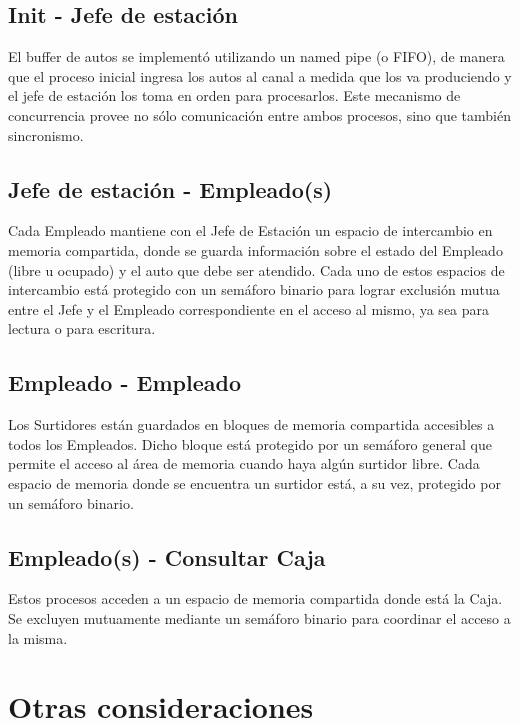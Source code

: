 \documentclass{article}
\begin{document}
\subsection{Init - Jefe de estación}
El buffer de autos se implementó utilizando un named pipe (o FIFO), de manera que el proceso inicial ingresa los autos al canal a medida que los va produciendo y el jefe de estación los toma en orden para procesarlos. Este mecanismo de concurrencia provee no sólo comunicación entre ambos procesos, sino que también sincronismo.
\subsection{Jefe de estación - Empleado(s)}
Cada Empleado mantiene con el Jefe de Estación un espacio de intercambio en memoria compartida, donde se guarda información sobre el estado del Empleado (libre u ocupado) y el auto que debe ser atendido. Cada uno de estos espacios de intercambio está protegido con un semáforo binario para lograr exclusión mutua entre el Jefe y el Empleado correspondiente en el acceso al mismo, ya sea para lectura o para escritura.
\subsection{Empleado - Empleado}
Los Surtidores están guardados en bloques de memoria compartida accesibles a todos los Empleados. Dicho bloque está protegido por un semáforo general que permite el acceso al área de memoria cuando haya algún surtidor libre. Cada espacio de memoria donde se encuentra un surtidor está, a su vez, protegido por un semáforo binario.
\subsection{Empleado(s) - Consultar Caja}
Estos procesos acceden a un espacio de memoria compartida donde está la Caja. Se excluyen mutuamente mediante un semáforo binario para coordinar el acceso a la misma.

\section{Otras consideraciones}
\end{document}
